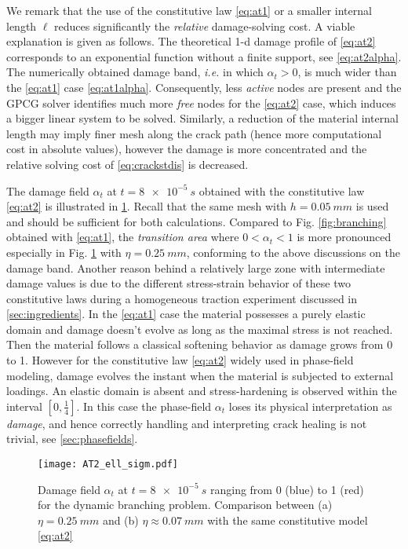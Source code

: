 We remark that the use of the constitutive law \eqref{eq:at1} or a smaller internal length $\ell$ reduces significantly the \emph{relative} damage-solving cost. A viable explanation is given as follows. The theoretical 1-d damage profile of \eqref{eq:at2} corresponds to an exponential function without a finite support, see \eqref{eq:at2alpha}. The numerically obtained damage band, \emph{i.e.} in which $\alpha_t>0$, is much wider than the \eqref{eq:at1} case \eqref{eq:at1alpha}. Consequently, less \emph{active} nodes are present and the GPCG solver identifies much more \emph{free} nodes for the \eqref{eq:at2} case, which induces a bigger linear system to be solved. Similarly, a reduction of the material internal length may imply finer mesh along the crack path (hence more computational cost in absolute values), however the damage is more concentrated and the relative solving cost of \eqref{eq:crackstdis} is decreased.

The damage field $\alpha_t$ at $t=\SI{8e-5}{s}$ obtained with the constitutive law \eqref{eq:at2} is illustrated in \cref{fig:at2_ell_sigm}. Recall that the same mesh with $h=\SI{0.05}{mm}$ is used and should be sufficient for both calculations. Compared to Fig. \ref{fig:branching} obtained with \eqref{eq:at1}, the \emph{transition area} where $0<\alpha_t<1$ is more pronounced especially in Fig. \ref{fig:at2_ell_sigm} with $\eta=\SI{0.25}{mm}$, conforming to the above discussions on the damage band. Another reason behind a relatively large zone with intermediate damage values is due to the different stress-strain behavior of these two constitutive laws during a homogeneous traction experiment discussed in \cref{sec:ingredients}. In the \eqref{eq:at1} case the material possesses a purely elastic domain and damage doesn't evolve as long as the maximal stress is not reached. Then the material follows a classical softening behavior as damage grows from 0 to 1. However for the constitutive law \eqref{eq:at2} widely used in phase-field modeling, damage evolves the instant when the material is subjected to external loadings. An elastic domain is absent and stress-hardening is observed within the interval $[0,\frac{1}{4}]$. In this case the phase-field $\alpha_t$ loses its physical interpretation as \emph{damage}, and hence correctly handling and interpreting crack healing is not trivial, see \cref{sec:phasefields}.
\begin{figure}[htbp]
\centering
\texttt{[image: AT2\_ell\_sigm.pdf]}
\caption{Damage field $\alpha_t$ at $t=\SI{8e-5}{s}$ ranging from 0 (blue) to 1 (red) for the dynamic branching problem. Comparison between (a) $\eta=\SI{0.25}{mm}$ and (b) $\eta\approx\SI{0.07}{mm}$ with the same constitutive model \eqref{eq:at2}} \label{fig:at2_ell_sigm}
\end{figure}

